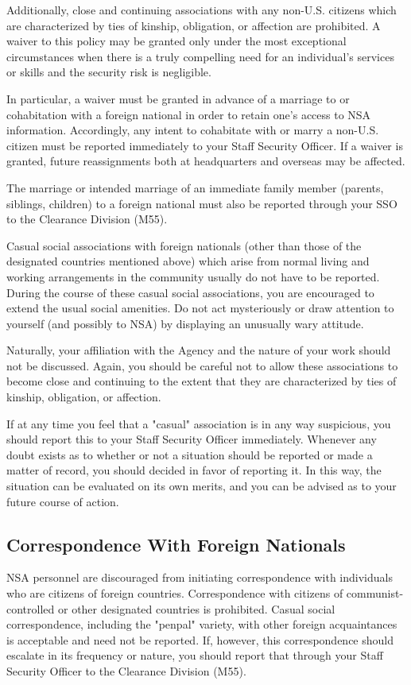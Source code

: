 \documentclass[a4]{article}
\begin{document}
Additionally, close and continuing associations with any non-U.S. citizens
which are characterized by ties of kinship, obligation, or affection are
prohibited.  A waiver to this policy may be granted only under the most
exceptional circumstances when there is a truly compelling need for an
individual's services or skills and the security risk is negligible.

In particular, a waiver must be granted in advance of a marriage to or
cohabitation with a foreign national in order to retain one's access to NSA
information.  Accordingly, any intent to cohabitate with or marry a non-U.S.
citizen must be reported immediately to your Staff Security Officer.  If a
waiver is granted, future reassignments both at headquarters and overseas may
be affected.

The marriage or intended marriage of an immediate family member (parents,
siblings, children) to a foreign national must also be reported through your
SSO to the Clearance Division (M55).

Casual social associations with foreign nationals (other than those of the
designated countries mentioned above) which arise from normal living and
working arrangements in the community usually do not have to be reported.
During the course of these casual social associations, you are encouraged to
extend the usual social amenities.  Do not act mysteriously or draw attention
to yourself (and possibly to NSA) by displaying an unusually wary attitude.

Naturally, your affiliation with the Agency and the nature of your work should
not be discussed.  Again, you should be careful not to allow these associations
to become close and continuing to the extent that they are characterized by
ties of kinship, obligation, or affection.

If at any time you feel that a "casual" association is in any way suspicious,
you should report this to your Staff Security Officer immediately.  Whenever
any doubt exists as to whether or not a situation should be reported or made a
matter of record, you should decided in favor of reporting it.  In this way,
the situation can be evaluated on its own merits, and you can be advised as to
your future course of action.

\subsection{Correspondence With Foreign Nationals}

NSA personnel are discouraged from initiating correspondence with individuals
who are citizens of foreign countries.  Correspondence with citizens of
communist-controlled or other designated countries is prohibited.  Casual
social correspondence, including the "penpal" variety, with other foreign
acquaintances is acceptable and need not be reported.  If, however, this
correspondence should escalate in its frequency or nature, you should report
that through your Staff Security Officer to the Clearance Division (M55).
\end{document}
